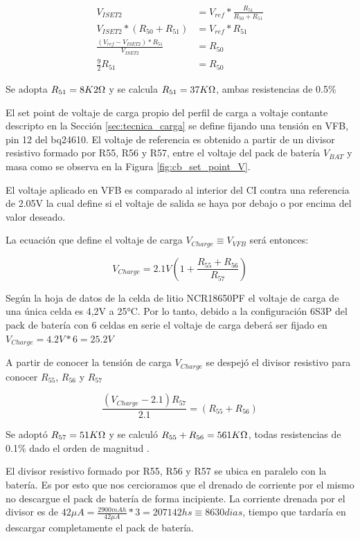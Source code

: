 \documentclass[10pt, a4paper]{report}
\begin{document}
\begin{align}
    V_{ISET2}&=V_{ref}*\frac{R_{51}}{R_{50}+R_{51}}\\
    V_{ISET2}*(R_{50}+R_{51})&=V_{ref}*R_{51}\\
    \frac{(V_{ref}-V_{ISET2})*R_{51}}{V_{ISET2}}&=R_{50} \\
    \frac{9}{2}R_{51}&=R_{50}
\end{align}

Se adopta $R_{51} = 8K2\ohm$ y se calcula $R_{51} = 37K\ohm$, ambas resistencias
de 0.5\%

El set point de voltaje de carga propio del perfil de carga a voltaje contante
descripto en la Sección \ref{sec:tecnica_carga} se define fijando una tensión en
VFB, pin 12 del bq24610. El voltaje de referencia es obtenido a partir de un
divisor resistivo formado por R55, R56 y R57, entre el voltaje del pack de
batería $V_{BAT}$ y masa como se observa en la Figura \ref{fig:cb_set_point_V}. 

El voltaje aplicado en VFB es comparado al interior del \acrshort{CI} contra una
referencia de 2.05V la cual define si el voltaje de salida se haya por debajo o
por encima del valor deseado. 

La ecuación que define el voltaje de carga $V_{Charge} \equiv V_{VFB}$ será entonces:

\begin{equation}
    V_{Charge}=2.1V(1+\frac{R_{55}+R_{56}}{R_{57}})
\end{equation}

Según la hoja de datos de la celda de litio NCR18650PF el voltaje de carga de
una única celda es 4,2V a 25°C. Por lo tanto, debido a la configuración 6S3P del
pack de batería con 6 celdas en serie el voltaje de carga deberá ser fijado en
$V_{Charge} = 4.2V*6 = 25.2V$

A partir de conocer la tensión de carga $V_{Charge}$ se despej\'o el divisor
resistivo para conocer $R_{55}$, $R_{56}$ y $R_{57}$

\begin{equation}
	\frac{(V_{Charge}- 2.1)R_{57}}{2.1}=(R_{55}+R_{56})
\end{equation}

Se adoptó $R_{57}= 51K\ohm$ y se calculó $R_{55}+R_{56}=561K\ohm$, todas
resistencias de 0.1\% dado el orden de magnitud .

El divisor resistivo formado por R55, R56 y R57 se ubica en paralelo con la
batería. Es por esto que nos cercioramos que el drenado de corriente por el
mismo no descargue el pack de batería de forma incipiente. La corriente drenada
por el divisor es de $42\mu A=\frac{2900mAh}{42\mu A}*3=207142 hs \equiv 8630
dias$, tiempo que tardaría en descargar completamente el pack de batería.
\end{document}

